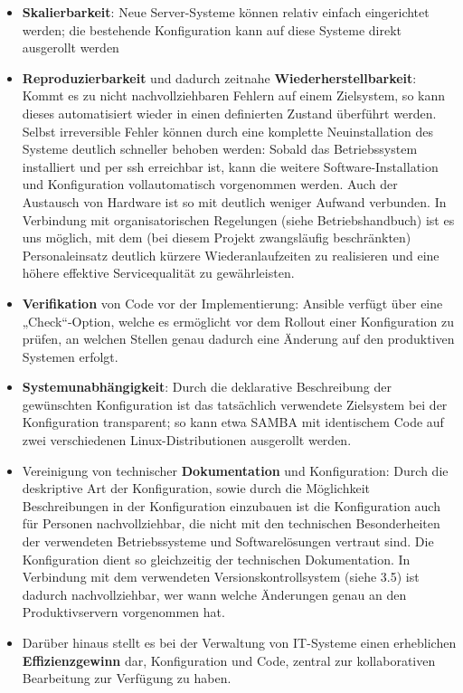 \begin{itemize}
\item \textbf{Skalierbarkeit}: Neue Server-Systeme können relativ einfach eingerichtet werden; die bestehende Konfiguration kann auf diese Systeme direkt ausgerollt werden
\item \textbf{Reproduzierbarkeit} und dadurch zeitnahe \textbf{Wiederherstellbarkeit}: Kommt es zu nicht nachvollziehbaren Fehlern auf einem Zielsystem, so kann dieses automatisiert wieder in einen definierten Zustand überführt werden. Selbst irreversible Fehler können durch eine komplette Neuinstallation des Systeme deutlich schneller behoben werden: Sobald das Betriebssystem installiert und per ssh erreichbar ist, kann die weitere Software-Installation und Konfiguration vollautomatisch vorgenommen werden. Auch der Austausch von Hardware ist so mit deutlich weniger Aufwand verbunden. In Verbindung mit organisatorischen Regelungen (siehe Betriebshandbuch) ist es uns möglich, mit dem (bei diesem Projekt zwangsläufig beschränkten) Personaleinsatz deutlich kürzere Wiederanlaufzeiten zu realisieren und eine höhere effektive Servicequalität zu gewährleisten.
\item \textbf{Verifikation} von Code vor der Implementierung: Ansible verfügt über eine „Check“-Option, welche es ermöglicht vor dem Rollout einer Konfiguration zu prüfen, an welchen Stellen genau dadurch eine Änderung auf den produktiven Systemen erfolgt.
\item \textbf{Systemunabhängigkeit}: Durch die deklarative Beschreibung der gewünschten Konfiguration ist das tatsächlich verwendete Zielsystem bei der Konfiguration transparent; so kann etwa SAMBA mit identischem Code auf zwei verschiedenen Linux-Distributionen ausgerollt werden.
\item Vereinigung von technischer \textbf{Dokumentation} und Konfiguration: Durch die deskriptive Art der Konfiguration, sowie durch die Möglichkeit Beschreibungen in der Konfiguration einzubauen ist die Konfiguration auch für Personen nachvollziehbar, die nicht mit den technischen Besonderheiten der verwendeten Betriebssysteme und Softwarelösungen vertraut sind. Die Konfiguration dient so gleichzeitig der technischen Dokumentation. In Verbindung mit dem verwendeten Versionskontrollsystem (siehe 3.5) ist dadurch nachvollziehbar, wer wann welche Änderungen genau an den Produktivservern vorgenommen hat.
\item Darüber hinaus stellt es bei der Verwaltung von IT-Systeme einen erheblichen \textbf{Effizienzgewinn} dar, Konfiguration und Code, zentral zur kollaborativen Bearbeitung zur Verfügung zu haben.
\end{itemize}

